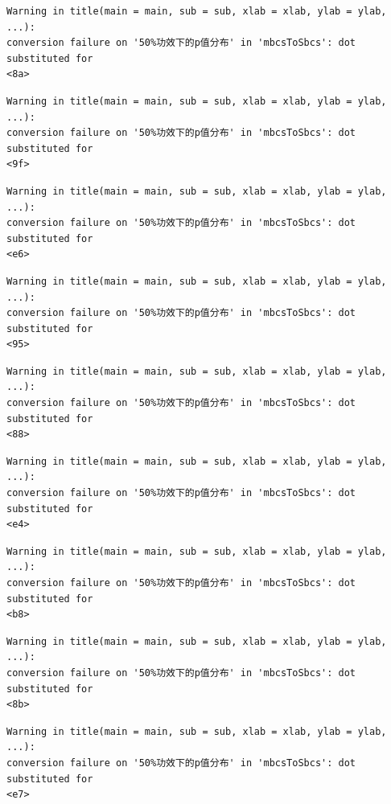 \documentclass[
  letterpaper,
  DIV=11,
  numbers=noendperiod]{scrreprt}
\begin{document}
\begin{verbatim}
Warning in title(main = main, sub = sub, xlab = xlab, ylab = ylab, ...):
conversion failure on '50%功效下的p值分布' in 'mbcsToSbcs': dot substituted for
<8a>
\end{verbatim}

\begin{verbatim}
Warning in title(main = main, sub = sub, xlab = xlab, ylab = ylab, ...):
conversion failure on '50%功效下的p值分布' in 'mbcsToSbcs': dot substituted for
<9f>
\end{verbatim}

\begin{verbatim}
Warning in title(main = main, sub = sub, xlab = xlab, ylab = ylab, ...):
conversion failure on '50%功效下的p值分布' in 'mbcsToSbcs': dot substituted for
<e6>
\end{verbatim}

\begin{verbatim}
Warning in title(main = main, sub = sub, xlab = xlab, ylab = ylab, ...):
conversion failure on '50%功效下的p值分布' in 'mbcsToSbcs': dot substituted for
<95>
\end{verbatim}

\begin{verbatim}
Warning in title(main = main, sub = sub, xlab = xlab, ylab = ylab, ...):
conversion failure on '50%功效下的p值分布' in 'mbcsToSbcs': dot substituted for
<88>
\end{verbatim}

\begin{verbatim}
Warning in title(main = main, sub = sub, xlab = xlab, ylab = ylab, ...):
conversion failure on '50%功效下的p值分布' in 'mbcsToSbcs': dot substituted for
<e4>
\end{verbatim}

\begin{verbatim}
Warning in title(main = main, sub = sub, xlab = xlab, ylab = ylab, ...):
conversion failure on '50%功效下的p值分布' in 'mbcsToSbcs': dot substituted for
<b8>
\end{verbatim}

\begin{verbatim}
Warning in title(main = main, sub = sub, xlab = xlab, ylab = ylab, ...):
conversion failure on '50%功效下的p值分布' in 'mbcsToSbcs': dot substituted for
<8b>
\end{verbatim}

\begin{verbatim}
Warning in title(main = main, sub = sub, xlab = xlab, ylab = ylab, ...):
conversion failure on '50%功效下的p值分布' in 'mbcsToSbcs': dot substituted for
<e7>
\end{verbatim}
\end{document}
